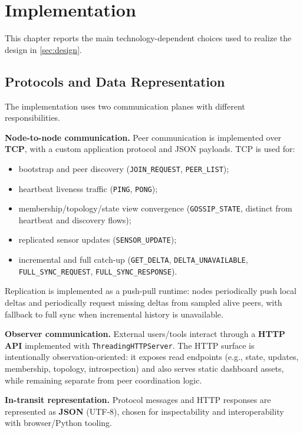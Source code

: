 \section{Implementation}\label{implementation}

This chapter reports the main technology-dependent choices used to realize the design in \cref{sec:design}.

\subsection{Protocols and Data Representation}
\label{implementation-protocols}

The implementation uses two communication planes with different responsibilities.

\textbf{Node-to-node communication.}
Peer communication is implemented over \textbf{TCP}, with a custom application protocol and JSON payloads. TCP is used for:
\begin{itemize}
  \item bootstrap and peer discovery (\texttt{JOIN\_REQUEST}, \texttt{PEER\_LIST});
  \item heartbeat liveness traffic (\texttt{PING}, \texttt{PONG});
  \item membership/topology/state view convergence (\texttt{GOSSIP\_STATE}, distinct from heartbeat and discovery flows);
  \item replicated sensor updates (\texttt{SENSOR\_UPDATE});
  \item incremental and full catch-up (\texttt{GET\_DELTA}, \texttt{DELTA\_UNAVAILABLE}, \texttt{FULL\_SYNC\_REQUEST}, \texttt{FULL\_SYNC\_RESPONSE}).
\end{itemize}

Replication is implemented as a push-pull runtime: nodes periodically push local deltas and periodically request missing deltas from sampled alive peers, with fallback to full sync when incremental history is unavailable.

\textbf{Observer communication.}
External users/tools interact through a \textbf{HTTP API} implemented with \texttt{ThreadingHTTPServer}. The HTTP surface is intentionally observation-oriented: it exposes read endpoints (e.g., state, updates, membership, topology, introspection) and also serves static dashboard assets, while remaining separate from peer coordination logic.

\textbf{In-transit representation.}
Protocol messages and HTTP responses are represented as \textbf{JSON} (UTF-8), chosen for inspectability and interoperability with browser/Python tooling.


